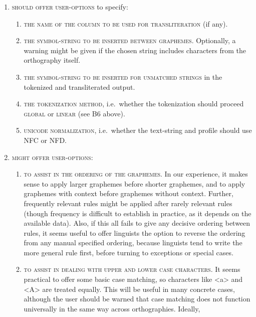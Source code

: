 \begin{enumerate}
	\def\labelenumi{\arabic{enumi}.} 
	\item \textsc{should offer user-options} to specify:
	\begin{enumerate}
		\def\labelenumii{C\arabic{enumii}.} 
		\item \textsc{the name of the column to be used for transliteration} (if any). 
		\item \textsc{the symbol-string to be inserted between graphemes.} Optionally,
        a warning might be given if the chosen string includes characters from
        the orthography itself. 
		\item \textsc{the symbol-string to be inserted for unmatched strings} in the
        tokenized and transliterated output. 
		\item \textsc{the tokenization method}, i.e.~whether the tokenization should
        proceed \textsc{global} or \textsc{linear} (see B6 above). 
		\item \textsc{unicode normalization}, i.e.~whether the text-string and profile
        should use \textsc{NFC} or \textsc{NFD}. 
    \end{enumerate}
	\item \textsc{might offer user-options}:
	\begin{enumerate}
		\def\labelenumii{C\arabic{enumii}.} \setcounter{enumii}{5} 
		\item \textsc{to assist in the ordering of the graphemes.} In our experience, it
        makes sense to apply larger graphemes before shorter graphemes, and to
        apply graphemes with context before graphemes without context. Further,
        frequently relevant rules might be applied after rarely relevant rules
        (though frequency is difficult to establish in practice, as it depends
        on the available data). Also, if this all fails to give any decisive
        ordering between rules, it seems useful to offer linguists the option to
        reverse the ordering from any manual specified ordering, because
        linguists tend to write the more general rule first, before turning to
        exceptions or special cases. 
		\item \textsc{to assist in dealing with upper and lower case characters.} It
        seems practical to offer some basic case matching, so characters like
        <a> and <A> are treated equally. This will be useful in many concrete
        cases, although the user should be warned that case matching does not
        function universally in the same way across orthographies. Ideally,

\end{enumerate}
\end{enumerate}
